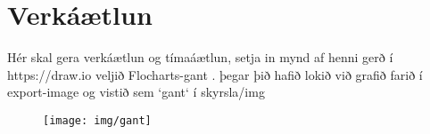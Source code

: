 \section{Verkáætlun}
Hér skal gera verkáætlun og tímaáætlun, setja in mynd af henni gerð í https://draw.io veljið Flocharts-gant .  þegar þið hafið lokið við grafið farið í export-image og vistið sem `gant` í skyrsla/img
\begin{figure}[h]
\texttt{[image: img/gant]}
\end{figure}